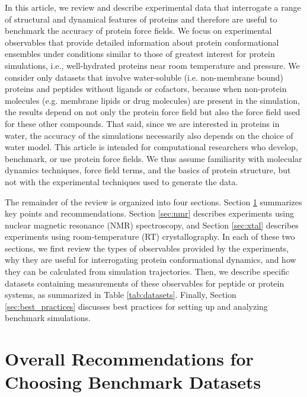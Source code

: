 \documentclass[9pt,review]{livecoms}
\begin{document}
In this article, we review and describe experimental data that interrogate a range of structural and dynamical features of proteins and therefore are useful to benchmark the accuracy of protein force fields.
We focus on experimental observables that provide detailed information about protein conformational ensembles under conditions similar to those of greatest interest for protein simulations, i.e., well-hydrated proteins near room temperature and pressure.
We consider only datasets that involve water-soluble (i.e. non-membrane bound) proteins and peptides without ligands or cofactors, because when non-protein molecules (e.g. membrane lipids or drug molecules) are present in the simulation, the results depend on not only the protein force field but also the force field used for these other compounds.
That said, since we are interested in proteins in water, the accuracy of the simulations necessarily also depends on the choice of water model.
This article is intended for computational researchers who develop, benchmark, or use protein force fields.
We thus assume familiarity with molecular dynamics techniques, force field terms, and the basics of protein structure, but not with the experimental techniques used to generate the data.

The remainder of the review is organized into four sections.
Section \ref{sec:overall} summarizes key points and recommendations.
Section \ref{sec:nmr} describes experiments using nuclear magnetic resonance (NMR) spectroscopy, and Section \ref{sec:xtal} describes experiments using room-temperature (RT) crystallography.
In each of these two sections, we first review the types of observables provided by the experiments, why they are useful for interrogating protein conformational dynamics, and how they can be calculated from simulation trajectories.
Then, we describe specific datasets containing measurements of these observables for peptide or protein systems, as summarized in Table \ref{tab:datasets}.
Finally, Section \ref{sec:best_practices} discusses best practices for setting up and analyzing benchmark simulations.

\section{Overall Recommendations for Choosing Benchmark Datasets}
\label{sec:overall}
 
\end{document}

